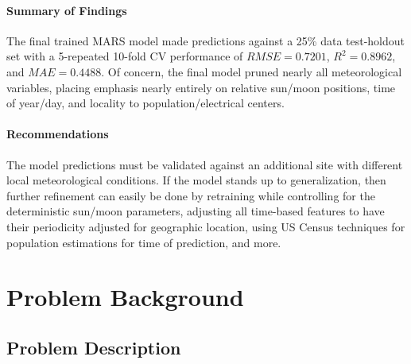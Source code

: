 \documentclass[11 pt]{article}  %
\begin{document}
\paragraph{Summary of Findings} The final trained MARS model made predictions 
against a 25\% data test-holdout set with a 5-repeated 10-fold CV performance of
$RMSE=0.7201$, $R^2 = 0.8962$, and $MAE = 0.4488$. Of concern, the final model 
pruned nearly all meteorological variables, placing emphasis nearly entirely on 
relative sun/moon positions, time of year/day, and locality to population/electrical 
centers.

\paragraph{Recommendations} The model predictions must be validated against an 
additional site with different local meteorological conditions. If the model stands
up to generalization, then further refinement can easily be done by retraining 
while controlling for the deterministic sun/moon parameters, adjusting all time-based
features to have their periodicity adjusted for geographic location, using US Census
techniques for population estimations for time of prediction, and more.

\pagebreak

\section{Problem Background}


\subsection{Problem Description}
\end{document}
